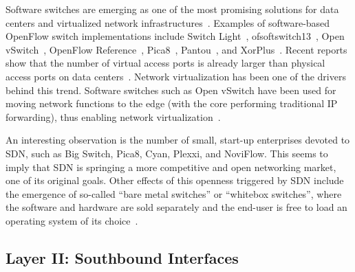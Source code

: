 
Software switches are emerging as one of the most promising 
solutions for data centers and virtualized network infrastructures~\cite{weissberger2013,schenker2013,casado2013}.
Examples of software-based OpenFlow switch implementations include Switch Light~\cite{bigswitchnetworks2013}, ofsoftswitch13~\cite{cpqd2013}, Open vSwitch~\cite{listofcontributors2013}, OpenFlow Reference~\cite{openflowcommunity2009}, Pica8~\cite{pica8opennetworking2013-1}, Pantou~\cite{yiakoumis2011}, and XorPlus~\cite{shang2014}.
Recent reports show that the number of virtual access ports is already larger than physical access ports on data centers~\cite{casado2013}. 
Network virtualization has been one of the drivers behind this trend.
Software switches such as Open vSwitch have been used for moving network functions to the edge (with the core performing traditional IP forwarding), thus enabling network virtualization~\cite{koponen}.

An interesting observation is the number of small, start-up enterprises devoted to SDN, such as 
Big Switch, Pica8, Cyan, Plexxi, and NoviFlow. This seems to imply that SDN is springing a more competitive and open 
networking market, one of its original goals.
Other effects of this openness triggered by SDN include the emergence of so-called ``bare metal switches'' or ``whitebox switches'', where the software and hardware are sold separately and the end-user is free to load an operating system of its choice~\cite{onie2013}. 


\subsection{Layer II: Southbound Interfaces}
\label{sec:southboundAPIs}

